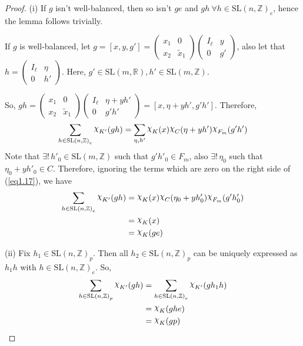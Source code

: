 \documentclass[11pt]{article}
\theoremstyle{definition}
\newcommand{\mychi}{\raisebox{2pt}{$\chi$}}
\begin{document}
\begin{proof}
    (i) If $g$ isn't well-balanced, then so isn't $ge$ and $gh \ \forall h \in {\mathrm{SL}(n, \mathbb{Z})}_e$, hence the lemma follows trivially.

    If $g$ is well-balanced, let $g= [x,y,g'] =
    \begin{pmatrix}
        x_1 & 0  \\
        x_2 & \widetilde{x}_1
    \end{pmatrix}
    \begin{pmatrix}
        I_\ell & y  \\
        0      & g'
    \end{pmatrix}
    $, also let that $h=
    \begin{pmatrix}
        I_ \ell & \eta   \\
        0       & h'
    \end{pmatrix}
    $.
    Here, $g' \in \mathrm{SL}(m, \mathbb{R}), h' \in \mathrm{SL}(m, \mathbb{Z})$.

    So, $gh=
    \begin{pmatrix}
        x_1 & 0  \\
        x_2 & \widetilde{x}_1
    \end{pmatrix}
    \begin{pmatrix}
        I_ \ell  & \eta + yh'  \\
        0        & g'h'
    \end{pmatrix}
    = [x, \eta + yh', g'h']
    $.
    Therefore,
    \begin{equation}\label{eq1.17}
        \displaystyle\sum_{h \in {\mathrm{SL}(n, \mathbb{Z})}_e} \mychi _{K'} (gh) = \displaystyle\sum_{\eta , h'} \mychi _K(x) \mychi _C(\eta +yh')\mychi _{F_m}(g'h')
    \end{equation}
    Note that $\exists!\, h'_0 \in \mathrm{SL}(m, \mathbb{Z})$ such that $g'h'_0 \in F_m$, also $\exists!\, \eta _0$ such that $\eta _0 + yh'_0 \in C$.
    Therefore, ignoring the terms which are zero on the right side of (\ref{eq1.17}), we have
    \begin{align*}
        \displaystyle\sum_{h \in {\mathrm{SL}(n, \mathbb{Z})}_e} \mychi _{K'} (gh) &= \mychi_K (x) \mychi _C(\eta _0 + yh'_0) \mychi _{F_m} (g' h'_0) \\
        &= \mychi _K(x)\\
        &= \mychi _K(ge)
    \end{align*}

    (ii) Fix $h_1 \in {\mathrm{SL}(n, \mathbb{Z})}_p$.
    Then all $h_2 \in {\mathrm{SL}(n, \mathbb{Z})}_p$ can be uniquely expressed as $h_1h$ with $h \in {\mathrm{SL}(n, \mathbb{Z})}_e$.
    So,
    \begin{align*}
        \displaystyle\sum_{h \in {\mathrm{SL}(n, \mathbb{Z})}_p} \mychi _{K'} (gh) &= \displaystyle\sum_{h \in {\mathrm{SL}(n, \mathbb{Z})}_e} \mychi _{K'}(gh_1h)\\
        &= \mychi _K (ghe)\\
        &= \mychi _K (gp)
    \end{align*}

\end{proof}
\end{document}
